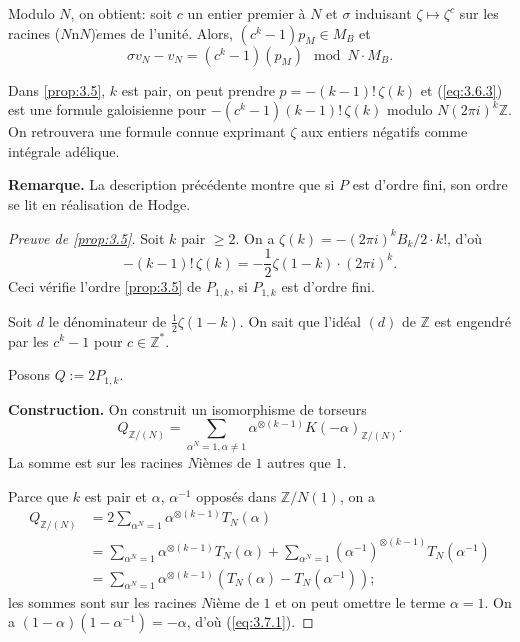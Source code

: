\documentclass[12pt,a4paper]{article}
\theoremstyle{plain}
\theoremstyle{definition}
\theoremstyle{remark}
\begin{document}
\begin{paraphrase}[3.6]
Modulo $N$, on obtient: soit $c$ un entier premier \`a $N$ et $\sigma$ induisant
$\zeta \mapsto \zeta^c$ sur les racines ($N$n$N$)$\grave{e}$mes de l'unit\'e. Alors,
$(c^k-1)p_M \in M_B$ et
\begin{equation}\label{eq:3.6.3}
\sigma v_N - v_N = (c^k-1)(p_M) \mod N \cdot M_B.
\end{equation}

Dans \ref{prop:3.5}, $k$ est pair, on peut prendre $p = -(k-1)!\,\zeta(k)$ et
(\ref{eq:3.6.3}) est une formule galoisienne pour $-(c^k-1)(k-1)!\,\zeta(k)$ modulo
$N(2\pi i)^k \mathbb{Z}$. On retrouvera une formule connue exprimant $\zeta$ aux entiers
n\'egatifs comme int\'egrale ad\'elique.

\textbf{Remarque.} La description pr\'ec\'edente montre que si $P$ est d'ordre fini, son
ordre se lit en r\'ealisation de Hodge.
\end{paraphrase}

\begin{proof}[Preuve de \ref{prop:3.5}]
Soit $k$ pair $\geq 2$. On a $\zeta(k) = -(2\pi i)^k B_k / 2 \cdot k!$, d'o\`u
\[
-(k-1)!\,\zeta(k) = -\frac{1}{2}\zeta(1-k) \cdot (2\pi i)^k.
\]
Ceci v\'erifie l'ordre \ref{prop:3.5} de $P_{1,k}$, si $P_{1,k}$ est d'ordre fini.

Soit $d$ le d\'enominateur de $\frac{1}{2}\zeta(1-k)$. On sait que l'id\'eal $(d)$ de
$\mathbb{Z}$ est engendr\'e par les $c^k-1$ pour $c \in \mathbb{Z}^*$.

Posons $Q := 2P_{1,k}$.

\textbf{Construction.} On construit un isomorphisme de torseurs
\begin{equation}\label{eq:3.7.1}
Q_{\mathbb{Z}/(N)} = \sum_{\alpha^N=1, \alpha \neq 1} \alpha^{\otimes(k-1)}
K(-\alpha)_{\mathbb{Z}/(N)}.
\end{equation}
La somme est sur les racines $N$i\`emes de $1$ autres que $1$.

Parce que $k$ est pair et $\alpha$, $\alpha^{-1}$ oppos\'es dans $\mathbb{Z}/N(1)$, on a
\begin{align*}
Q_{\mathbb{Z}/(N)} &= 2 \sum_{\alpha^N=1} \alpha^{\otimes(k-1)} T_N(\alpha) \\
&= \sum_{\alpha^N=1} \alpha^{\otimes(k-1)} T_N(\alpha) +
\sum_{\alpha^N=1} (\alpha^{-1})^{\otimes(k-1)} T_N(\alpha^{-1}) \\
&= \sum_{\alpha^N=1} \alpha^{\otimes(k-1)} (T_N(\alpha) - T_N(\alpha^{-1}));
\end{align*}
les sommes sont sur les racines $N$i\`eme de $1$ et on peut omettre le terme
$\alpha = 1$. On a $(1-\alpha)(1-\alpha^{-1}) = -\alpha$, d'o\`u
(\ref{eq:3.7.1}).
\end{proof}
\end{document}
